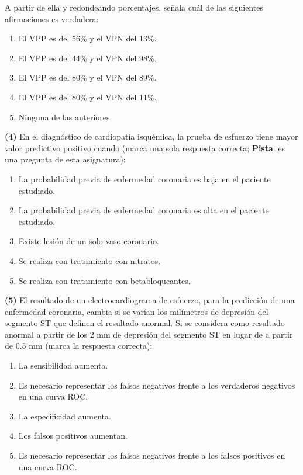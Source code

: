 \documentclass[
]{book}
\providecommand{\tightlist}{%
  \setlength{\itemsep}{0pt}\setlength{\parskip}{0pt}}
\theoremstyle{definition}
\theoremstyle{definition}
\theoremstyle{definition}
\theoremstyle{definition}
\theoremstyle{remark}
\begin{document}
A partir de ella y redondeando porcentajes, señala
cuál de las siguientes afirmaciones es verdadera:

\begin{enumerate}
\def\labelenumi{\arabic{enumi}.}
\tightlist
\item
  El VPP es del 56\% y el VPN del 13\%.
\item
  El VPP es del 44\% y el VPN del 98\%.
\item
  El VPP es del 80\% y el VPN del 89\%.
\item
  El VPP es del 80\% y el VPN del 11\%.
\item
  Ninguna de las anteriores.
\end{enumerate}

\textbf{(4)} En el diagnóstico de cardiopatía isquémica, la
prueba de esfuerzo tiene mayor valor predictivo positivo
cuando (marca una sola respuesta correcta; \textbf{Pista}: es una pregunta de esta asignatura):

\begin{enumerate}
\def\labelenumi{\arabic{enumi}.}
\tightlist
\item
  La probabilidad previa de enfermedad coronaria es baja en el paciente estudiado.
\item
  La probabilidad previa de enfermedad coronaria es alta en el paciente estudiado.
\item
  Existe lesión de un solo vaso coronario.
\item
  Se realiza con tratamiento con nitratos.
\item
  Se realiza con tratamiento con betabloqueantes.
\end{enumerate}

\textbf{(5)} El resultado de un electrocardiograma de esfuerzo,
para la predicción de una enfermedad
coronaria, cambia si se varían los milímetros
de depresión del segmento ST que definen el
resultado anormal. Si se considera como resultado
anormal a partir de los 2 mm de depresión
del segmento ST en lugar de a partir de
0.5 mm (marca la respuesta correcta):

\begin{enumerate}
\def\labelenumi{\arabic{enumi}.}
\tightlist
\item
  La sensibilidad aumenta.
\item
  Es necesario representar los falsos negativos frente a los verdaderos negativos en una curva ROC.
\item
  La especificidad aumenta.\\
\item
  Los falsos positivos aumentan.
\item
  Es necesario representar los falsos negativos
  frente a los falsos positivos en una curva ROC.
\end{enumerate}
\end{document}
